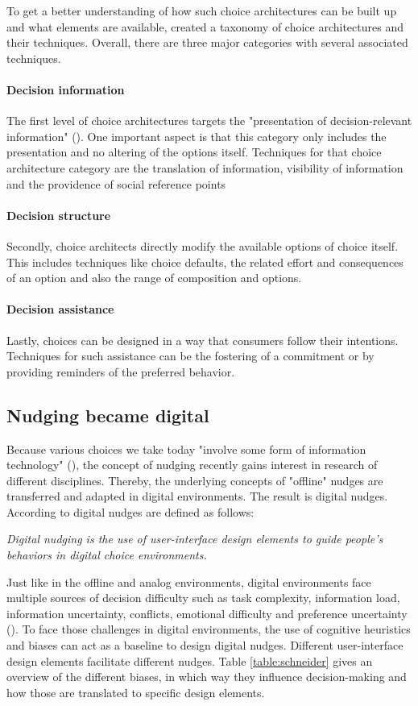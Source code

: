 To get a better understanding of how such choice architectures can be built up and what elements are available,  \cite{munscher_review_2016} created a taxonomy of choice architectures and their techniques. Overall, there are three major categories with several associated techniques. 
\paragraph{Decision information}
The first level of choice architectures targets the "presentation of decision-relevant information" (\cite{munscher_review_2016}). One important aspect is that this category only includes the presentation and no altering of the options itself. Techniques for that choice architecture category are the translation of information, visibility of information and the providence of social reference points
\paragraph{Decision structure}
Secondly, choice architects directly modify the available options of choice itself. This includes techniques like choice defaults, the related effort and consequences of an option and also the range of composition and options.
\paragraph{Decision assistance}
Lastly, choices can be designed in a way that consumers follow their intentions. Techniques for such assistance can be the fostering of a commitment or by providing reminders of the preferred behavior.

\subsection{Nudging became digital}
Because various choices we take today "involve some form of information technology" (\cite{johnson_beyond_2012}), the concept of nudging recently gains interest in research of different disciplines. Thereby, the underlying concepts of "offline" nudges are transferred and adapted in digital environments. The result is digital nudges. According to \cite{weinmann_digital_2016} digital nudges are defined as follows:
\begin{center}
\textit{Digital nudging is the use of user-interface design elements to guide people's behaviors in digital choice environments.}
\end{center}
Just like in the offline and analog environments, digital environments face multiple sources of decision difficulty such as task complexity, information load, information uncertainty, conflicts, emotional difficulty and preference uncertainty (\cite{broniarczyk_decision_2014}). To face those challenges in digital environments, the use of cognitive heuristics and biases can act as a baseline to design digital nudges. Different user-interface design elements facilitate different nudges. Table \ref{table:schneider} gives an overview of the different biases, in which way they influence decision-making and how those are translated to specific design elements.

